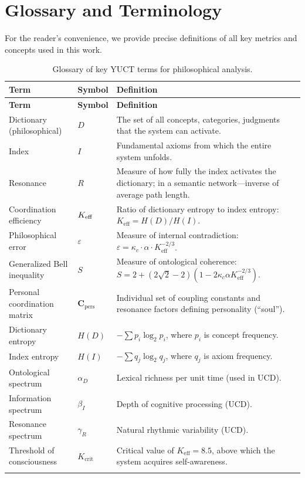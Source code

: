 \documentclass[12pt,a4paper]{article}
\newcommand{\kappac}{\kappa_c}
\newcommand{\eps}{\varepsilon}
\newcommand{\Cpers}{\mathbf{C}_{\text{pers}}}
\begin{document}
	\section{Glossary and Terminology}
	\label{sec:glossary}
	
	For the reader's convenience, we provide precise definitions of all key metrics and concepts used in this work.
	
	\begin{longtable}{p{3.5cm}p{5cm}p{4cm}}
		\toprule
		\textbf{Term} & \textbf{Symbol} & \textbf{Definition} \\
		\midrule
		\endfirsthead
		\toprule
		\textbf{Term} & \textbf{Symbol} & \textbf{Definition} \\
		\midrule
		\endhead
		Dictionary (philosophical) & \(D\) & The set of all concepts, categories, judgments that the system can activate. \\
		Index & \(I\) & Fundamental axioms from which the entire system unfolds. \\
		Resonance & \(R\) & Measure of how fully the index activates the dictionary; in a semantic network—inverse of average path length. \\
		Coordination efficiency & \(\Keff\) & Ratio of dictionary entropy to index entropy: \(K_{\mathrm{eff}} = H(D)/H(I)\). \\
		Philosophical error & \(\eps\) & Measure of internal contradiction: \(\eps = \kappac \cdot \alpha \cdot K_{\mathrm{eff}}^{-2/3}\). \\
		Generalized Bell inequality & \(S\) & Measure of ontological coherence: \(S = 2 + (2\sqrt{2}-2)(1 - 2\kappac\alpha K_{\mathrm{eff}}^{-2/3})\). \\
		Personal coordination matrix & \(\Cpers\) & Individual set of coupling constants and resonance factors defining personality (``soul''). \\
		Dictionary entropy & \(H(D)\) & \( -\sum p_i \log_2 p_i\), where \(p_i\) is concept frequency. \\
		Index entropy & \(H(I)\) & \( -\sum q_j \log_2 q_j\), where \(q_j\) is axiom frequency. \\
		Ontological spectrum & \(\alpha_D\) & Lexical richness per unit time (used in UCD). \\
		Information spectrum & \(\beta_I\) & Depth of cognitive processing (UCD). \\
		Resonance spectrum & \(\gamma_R\) & Natural rhythmic variability (UCD). \\
		Threshold of consciousness & \(K_{\mathrm{crit}}\) & Critical value of \(K_{\mathrm{eff}} = 8.5\), above which the system acquires self-awareness. \\
		\bottomrule
		\caption{Glossary of key YUCT terms for philosophical analysis.}
		\label{tab:glossary}
	\end{longtable}
	
\end{document}
